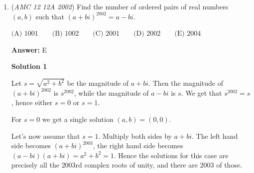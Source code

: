 \begin{enumerate}
\textbf{Solution 5 (Trigonometry)}

Let $\angle ACB = \theta$, $\angle DBC = \theta$, $\angle ABD = \theta$, $\angle ADB = 2 \theta$, $\angle BAC = 180^\circ - 3 \theta$
$[ABD] = \frac12 \cdot AD \cdot BD \cdot \sin \angle ADB = \frac12 \cdot 9 \cdot 7 \cdot \sin 2\theta$

 By the \href{https://artofproblemsolving.com/wiki/index.php?title=Law\_of\_Sines}{Law of Sines} we have $\frac{ \sin \angle BAC }{BD} = \frac{ \sin \angle ABD }{AD}$
$\frac{ \sin(180^\circ - 3 \theta) }{7} = \frac{ \sin \theta }{ 9 }$
$\frac{ \sin 3 \theta }{7} = \frac{ \sin \theta }{ 9 }$

 By the \href{https://artofproblemsolving.com/wiki/index.php/Trigonometric\_identities\#Triple-angle\_identities}{Triple-angle Identities}, $\sin 3 \theta = 3 \sin \theta - 4 \sin^3 \theta$
$3 - 4 \sin^2 \theta = \frac79$, $36 \sin^2 \theta = 20$, $\sin^2 \theta = \frac59$
$\sin \theta = \frac{\sqrt{5}}{3}$, $\cos \theta = \frac{2}{3}$

 By the \href{https://artofproblemsolving.com/wiki/index.php/Trigonometric\_identities\#Double-angle\_identities}{Double Angle Identity} $\sin 2 \theta = 2 \sin \theta \cos \theta = 2 \cdot \frac{\sqrt{5}}{3} \cdot \frac{2}{3} = \frac{ 4 \sqrt{5} }{9}$
$[ABD] = \frac12 \cdot 9 \cdot 7 \cdot \frac{ 4 \sqrt{5} }{9} =  \boxed{\textbf{(D) } 14 \sqrt{5} }$



	\item (\textit{AMC 12 12A 2002}) Find the number of ordered pairs of real numbers $(a,b)$ such that $(a+bi)^{2002} = a-bi$.


 $\text{(A) }1001 \qquad \text{(B) }1002 \qquad \text{(C) }2001 \qquad \text{(D) }2002 \qquad \text{(E) }2004$

 \textbf{Answer: }E



\textbf{Solution 1}

Let $s=\sqrt{a^2+b^2}$ be the magnitude of $a+bi$. Then the magnitude of $(a+bi)^{2002}$ is $s^{2002}$, while the magnitude of $a-bi$ is $s$. We get that $s^{2002}=s$, hence either $s=0$ or $s=1$.

 For $s=0$ we get a single solution $(a,b)=(0,0)$.

 Let's now assume that $s=1$. Multiply both sides by $a+bi$. The left hand side becomes $(a+bi)^{2003}$, the right hand side becomes $(a-bi)(a+bi)=a^2 + b^2 = 1$. Hence the solutions for this case are precisely all the $2003$rd complex roots of unity, and there are $2003$ of those.


\end{enumerate}
